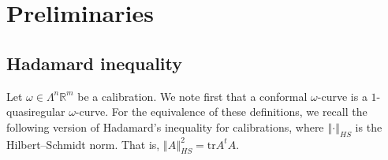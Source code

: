 \documentclass[a4paper,leqno,11pt]{amsart}
\numberwithin{equation}{section}
\theoremstyle{remark}
\theoremstyle{remark}
\newcommand{\R}{\mathbb{R}}
\newcommand{\norm}[1]{ \left\Vert #1 \right\Vert }	%
\begin{document}




\section{Preliminaries}
\label{sec:preliminaries}

\subsection{Hadamard inequality}
Let $\omega \in \Lambda^n \R^m$ be a calibration. We note first that a conformal $\omega$-curve is a $1$-quasiregular $\omega$-curve. 
For the equivalence of these definitions, we recall the following version of Hadamard's inequality for calibrations, where $\norm{\cdot}_{HS}$ is the Hilbert--Schmidt norm. That is, $\norm{A}_{HS}^2 = \mathrm{tr} A^t A$.
\end{document}
